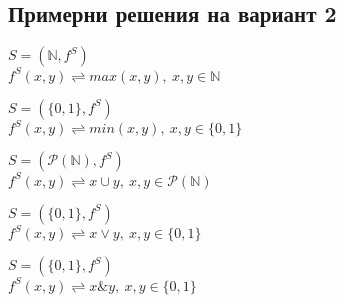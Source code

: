 \documentclass{article}
\begin{document}
\subsection{Примерни решения на вариант 2}
\begin{addmargin}[1em]{2em}
\begin{center}
$ S = ( \mathbb{N}, f^S)$ \\
$f^S(x, y)\rightleftharpoons max(x,y),\ x,y \in \mathbb{N}$
\end{center}
\end{addmargin}
\vskip 0.2in
\begin{addmargin}[1em]{2em}
\begin{center}
$ S = ( \{0, 1\}, f^S)$ \\
$f^S(x,y)\rightleftharpoons min(x,y) ,\ x,y \in \{0, 1\}$
\end{center}
\end{addmargin}
\vskip 0.2in
\begin{addmargin}[1em]{2em}
\begin{center}
$ S = ( \mathcal{P}(\mathbb{N}), f^S)$ \\
$f^S(x,y)\rightleftharpoons x \cup y ,\ x,y \in \mathcal{P}(\mathbb{N})$
\end{center}
\end{addmargin}
\vskip 0.2in
\begin{addmargin}[1em]{2em}
\begin{center}
$ S = ( \{0, 1\}, f^S)$ \\
$f^S(x,y)\rightleftharpoons x \lor y ,\ x,y \in \{0, 1\}$
\end{center}
\end{addmargin}
\vskip 0.2in
\begin{addmargin}[1em]{2em}
\begin{center}
$ S = ( \{0, 1\}, f^S)$ \\
$f^S(x,y)\rightleftharpoons x \& y ,\ x,y \in \{0, 1\}$
\end{center}
\end{addmargin}
\end{document}
